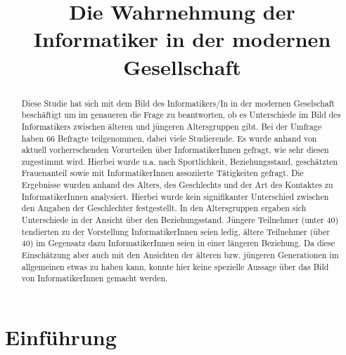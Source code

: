 \documentclass[de]{agse-empir-report}\usepackage[]{graphicx}\usepackage[]{color}
\begin{document}
\title{Die Wahrnehmung der Informatiker in der modernen Gesellschaft}
\author{
    \and
    \and
}

\maketitle


\begin{abstract}
  Diese Studie hat sich mit dem Bild des Informatikers/In in der modernen Geselschaft beschäftigt um im genaueren die Frage zu beantworten, ob es Unterschiede im Bild des Informatikers zwischen älteren und jüngeren Altersgruppen gibt. Bei der Umfrage haben 66 Befragte teilgenommen, dabei viele Studierende. Es wurde anhand von aktuell vorherrschenden Vorurteilen über InformatikerInnen gefragt, wie sehr diesen zugestimmt wird. Hierbei wurde u.a. nach Sportlichkeit, Beziehungsstand, geschätzten Frauenanteil sowie mit InformatikerInnen assoziierte Tätigkeiten gefragt. Die Ergebnisse wurden anhand des Alters, des Geschlechts und der Art des Kontaktes zu InformatikerInnen analysiert. Hierbei wurde kein signifikanter Unterschied zwischen den Angaben der Geschlechter festgestellt. In den Altersgruppen ergaben sich Unterschiede in der Ansicht über den Beziehungsstand. Jüngere Teilnehmer (unter 40) tendierten zu der Vorstellung InformatikerInnen seien ledig, ältere Teilnehmer (über 40) im Gegensatz dazu InformatikerInnen seien in einer längeren Beziehung. Da diese Einschätzung aber auch mit den Ansichten der älteren bzw. jüngeren Generationen im allgemeinen etwas zu haben kann, konnte hier keine spezielle Aussage über das Bild von InformatikerInnen gemacht werden. 
\end{abstract}


\section[jk]{Einführung}
\end{document}
